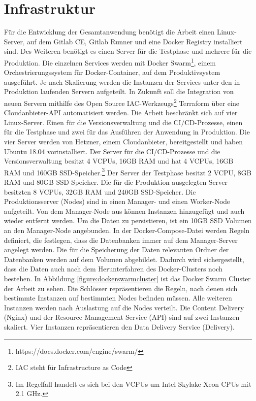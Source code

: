 \section{Infrastruktur}
\label{sec:infrastruktur}
Für die Entwicklung der Gesamtanwendung benötigt die Arbeit einen Linux-Server,
auf dem Gitlab CE, Gitlab Runner und eine Docker Registry
installiert sind. Des Weiteren benötigt es einen Server für die Testphase und mehrere für die
Produktion. Die einzelnen Services werden mit Docker Swarm\footnote{https://docs.docker.com/engine/swarm/},
einem Orchestrierungssystem für Docker-Container, auf dem Produktivsystem ausgeführt. Je nach Skalierung
werden die Instanzen der Services unter den in Produktion laufenden Servern aufgeteilt.
In Zukunft soll die Integration von neuen Servern mithilfe des Open Source IAC-Werkzeugs\footnote{IAC steht für Infrastructure as Code}
Terraform über eine Cloudanbieter-API automatisiert werden.
Die Arbeit beschränkt sich auf vier Linux-Server. Einen für die Versionsverwaltung
und die CI/CD-Prozesse, einen für die Testphase und zwei für das Ausführen der Anwendung in Produktion.
Die vier Server werden von Hetzner, einem Cloudanbieter, bereitgestellt und haben Ubuntu 18.04
vorinstalliert. Der Server für die CI/CD-Prozesse und die Versionsverwaltung besitzt 4 VCPUs, 
16GB RAM und  hat 4 VCPUs, 16GB RAM und 160GB SSD-Speicher.\footnote{Im Regelfall handelt es sich bei
den VCPUs um Intel Skylake Xeon CPUs mit 2.1 GHz.\cite{CPUusedInHetznerCLoud}}
Der Server der Testphase besitzt 2 VCPU, 8GB RAM und 80GB SSD-Speicher. Die für die Produktion
ausgelegten Server besitzten 8 VCPUs, 32GB RAM und 240GB SSD-Speicher.
Die Produktionsserver (Nodes) sind in einen Manager- und einen Worker-Node aufgeteilt. Von dem Manager-Node
aus können Instanzen hinzugefügt und auch wieder entfernt werden. Um die Daten zu persistieren,
ist ein 10GB SSD Volumen an den Manager-Node angebunden. In der Docker-Compose-Datei werden
Regeln definiert, die festlegen, dass die Datenbanken immer auf dem Manager-Server angelegt werden.
Die für die Speicherung der Daten relevanten Ordner der Datenbanken werden auf dem Volumen abgebildet.
Dadurch wird sichergestellt, dass die Daten auch nach dem Herunterfahren des Docker-Clusters noch bestehen.
In Abbildung \ref{figure:dockerswarmcluster} ist das Docker Swarm Cluster der Arbeit zu sehen. Die Schlösser
repräsentieren die Regeln, nach denen sich bestimmte Instanzen auf bestimmten Nodes befinden müssen.
Alle weiteren Instanzen werden nach Auslastung auf die Nodes verteilt. Die Content Delivery (Nginx)
und der Resource Management Service (API) sind auf zwei Instanzen skaliert. Vier Instanzen repräsentieren
den Data Delivery Service (Delivery).

